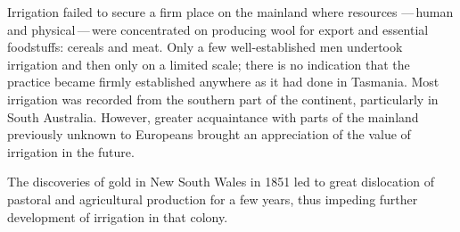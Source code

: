 \closure
Irrigation failed to secure a firm place on the mainland where
resources ---\,human and physical\,---\,were concentrated on producing
wool for export and essential foodstuffs: cereals and meat.  Only a
few well-established men undertook irrigation and then only on a
limited scale; there is no indication that the practice became firmly
established anywhere as it had done in Tasmania.  Most irrigation was
recorded from the southern part of the continent, particularly in
South Australia.  However, greater acquaintance with parts of the
mainland previously unknown to Europeans brought an appreciation of
the value of irrigation in the future.

The discoveries of gold in New South Wales in 1851 led to great
dislocation of pastoral and agricultural production for a few years,
thus impeding further development of irrigation in that colony.

